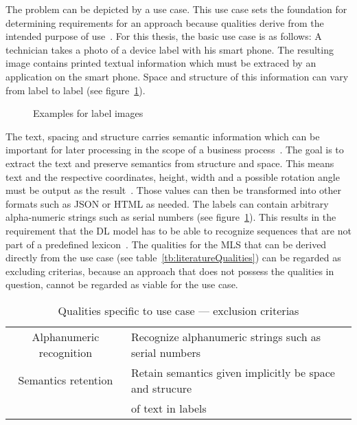The problem can be depicted by a use case.
This use case sets the foundation for determining requirements for an
approach because qualities derive from the intended purpose of
use~\citep{siebert_construction_2021}.
For this thesis, the basic use case is as follows:
A technician takes a photo of a device label with his smart phone.
The resulting image contains printed textual information which must be extraced by an application on
the smart phone.
Space and structure of this information can vary from label to label (see figure~\ref{fig:examples}).
\begin{figure}[h]
    \centering
    \caption{Examples for label images\label{fig:examples}}
\end{figure}
The text, spacing and structure carries semantic information which can be important for later
processing in the scope of a business process~\citep{chen_text_2021}.
The goal is to extract the text and preserve semantics from structure and space.
This means text and the respective coordinates, height, width and a possible rotation angle must
be output as the result~\citep{yang_learning_2021}.
Those values can then be transformed into other formats such as JSON or HTML as needed.
The labels can contain arbitrary alpha-numeric strings such as serial numbers (see
figure~\ref{fig:examples}).
This results in the requirement that the \ac{DL} model has to be able to recognize sequences that
are not part of a predefined lexicon~\citep{ghosh_visual_2017}.
The qualities for the \ac{MLS} that can be derived directly from the use case (see
table~\ref{tb:literatureQualities}) can be regarded as excluding criterias, because an approach
that does not possess the qualities in question, cannot be regarded as viable for the use case.
\begin{table}[h]
    \centering
    \begin{tabular}{c l}
        Alphanumeric recognition & Recognize alphanumeric strings such as serial numbers \\
        Semantics retention & Retain semantics given implicitly be space and strucure \\
                            & of text in labels \\
    \end{tabular}
    \caption{Qualities specific to use case --- exclusion criterias}
\end{table}

